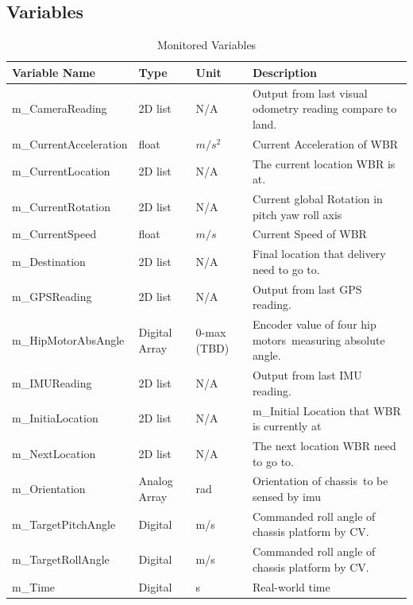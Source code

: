 \documentclass[12pt]{article}
\begin{document}
    \subsection{Variables}
        \begin{table}[H]
            \caption{Monitored Variables}
            \begin{tabularx}{\textwidth}{|p{5cm}|p{2.5cm}|p{1.25cm}|X|}
                \toprule
                \textbf{Variable Name} & \textbf{Type} & \textbf{Unit}   & \textbf{Description}\\
                \midrule
                 m\_CameraReading & 2D list &  N/A & Output from last visual odometry reading compare to land.\\
                 m\_CurrentAcceleration & float & $m/s^2$  & Current Acceleration of WBR\\ 
                 m\_CurrentLocation & 2D list &  N/A  & The current location WBR is at.\\
                m\_CurrentRotation & 2D list & N/A & Current global Rotation in pitch yaw roll axis\\
                m\_CurrentSpeed  & float & $m/s$ & Current Speed of WBR\\
                m\_Destination & 2D list  & N/A & Final location that delivery need to go to.\\
                m\_GPSReading & 2D list &  N/A & Output from last GPS reading.\\
                m\_HipMotorAbsAngle & Digital Array & 0-max (TBD) & Encoder value of four hip motors\, measuring absolute angle.\\
                m\_IMUReading & 2D list &  N/A & Output from last IMU reading.\\
                m\_InitiaLocation & 2D list &  N/A  & m\_Initial Location that WBR is currently at\\
                m\_NextLocation & 2D list &  N/A & The next location WBR need to go to.\\
               m\_Orientation        & Analog Array  & \unit{\radian}  & Orientation of chassis\, to be sensed by \acrshort{imu}\\
               m\_TargetPitchAngle & Digital & m/s  & Commanded roll angle of chassis platform by CV.\\
               m\_TargetRollAngle & Digital & m/s & Commanded roll angle of chassis platform by CV.\\
               m\_Time                & Digital        & \unit{\second}  & Real-world time\\

                \bottomrule
            \end{tabularx}
        \end{table}
\end{document}
